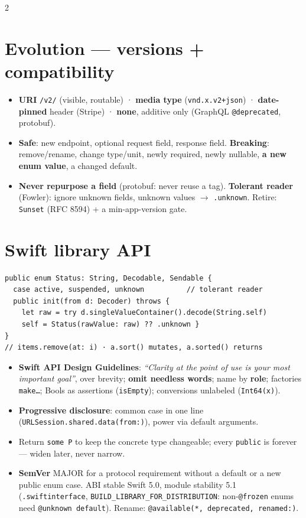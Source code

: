 \documentclass[8pt]{extarticle}
\begin{document}
\begin{multicols}{2}
\section{Evolution — versions + compatibility}
\begin{itemize}
  \item \textbf{URI} \texttt{/v2/} (visible, routable) · \textbf{media type}
        (\texttt{vnd.x.v2+json}) · \textbf{date-pinned} header (Stripe) · \textbf{none},
        additive only (GraphQL \texttt{@deprecated}, protobuf).
  \item \textbf{Safe}: new endpoint, optional request field, response field.
        \textbf{Breaking}: remove/rename, change type/unit, newly required, newly
        nullable, \textbf{a new enum value}, a changed default.
  \item \textbf{Never repurpose a field} (protobuf: never reuse a tag). \textbf{Tolerant
        reader} (Fowler): ignore unknown fields, unknown values $\to$ \texttt{.unknown}.
        Retire: \texttt{Sunset} (RFC 8594) + a min-app-version gate.
\end{itemize}

\section{Swift library API}
\begin{lstlisting}[language=SwiftSheet]
public enum Status: String, Decodable, Sendable {
  case active, suspended, unknown          // tolerant reader
  public init(from d: Decoder) throws {
    let raw = try d.singleValueContainer().decode(String.self)
    self = Status(rawValue: raw) ?? .unknown }
}
// items.remove(at: i) · a.sort() mutates, a.sorted() returns
\end{lstlisting}
\begin{itemize}
  \item \textbf{Swift API Design Guidelines}: \emph{``Clarity at the point of use is your most
        important goal''}, over brevity; \textbf{omit needless words}; name by \textbf{role};
        factories \texttt{make…}; Bools as assertions (\texttt{isEmpty}); conversions
        unlabeled (\texttt{Int64(x)}).
  \item \textbf{Progressive disclosure}: common case in one line
        (\texttt{URLSession.shared.data(from:)}), power via default arguments.
  \item Return \texttt{some P} to keep the concrete type changeable; every \texttt{public}
        is forever — widen later, never narrow.
  \item \textbf{SemVer} MAJOR for a protocol requirement without a default or a new public
        enum case. ABI stable Swift 5.0, module stability 5.1 (\texttt{.swiftinterface},
        \texttt{BUILD\_LIBRARY\_FOR\_DISTRIBUTION}: non-\texttt{@frozen} enums need
        \texttt{@unknown default}). Rename: \texttt{@available(*, deprecated, renamed:)}.
\end{itemize}


\end{multicols}
\end{document}
